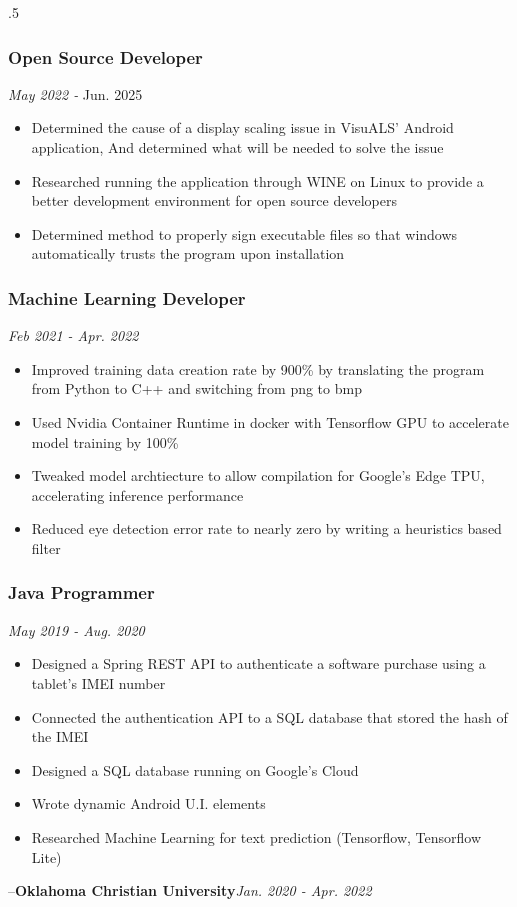 \documentclass{article}
\newcommand{\companyHeader}[2]{--\large{\bfseries{#1}}\hfill \small{\textsl{#2}}}
\begin{document}
\begin{spacing}{.5}
{		\subsubsection{\large{Open Source Developer}} \hfill \small{\textsl{May 2022 - }Jun. 2025}
			\begin{itemize}[label=--,itemsep=-.35ex]
				\item \large{Determined the cause of a display scaling issue in VisuALS' Android application, And determined what will be needed to solve the issue}
				\item \large{Researched running the application through WINE on Linux to provide a better development environment for open source developers}
				\item \large{Determined method to properly sign executable files so that windows automatically trusts the program upon installation}
			\end{itemize}
		\subsubsection{Machine Learning Developer} \hfill \small{\textsl{Feb 2021 - Apr. 2022}}
			\begin{itemize}[label=--,itemsep=-.35ex]
				\item \large{Improved training data creation rate by 900\% by translating the program from Python to C++ and switching from png to bmp}
				\item \large{Used Nvidia Container Runtime in docker with Tensorflow GPU to accelerate model training by 100\%}
				\item \large{Tweaked model archtiecture to allow compilation for Google's Edge TPU, accelerating inference performance}
				\item \large{Reduced eye detection error rate to nearly zero by writing a heuristics based filter}
			\end{itemize}
		\subsubsection{\large{Java Programmer}} \hfill \small{\textsl{May 2019 - Aug. 2020}}
			\begin{itemize}[label=--,itemsep=-.35ex]
				\item \large{Designed a Spring REST API to authenticate a software purchase using a tablet's IMEI number}
				\item \large{Connected the authentication API to a SQL database that stored the hash of the IMEI}
				\item \large{Designed a SQL database running on Google's Cloud}
				\item \large{Wrote dynamic Android U.I. elements}
				\item \large{Researched Machine Learning for text prediction} \small{(Tensorflow, Tensorflow Lite)}
			\end{itemize}
	\companyHeader{Oklahoma Christian University}{Jan. 2020 - Apr. 2022}
}
\end{spacing}
\end{document}

